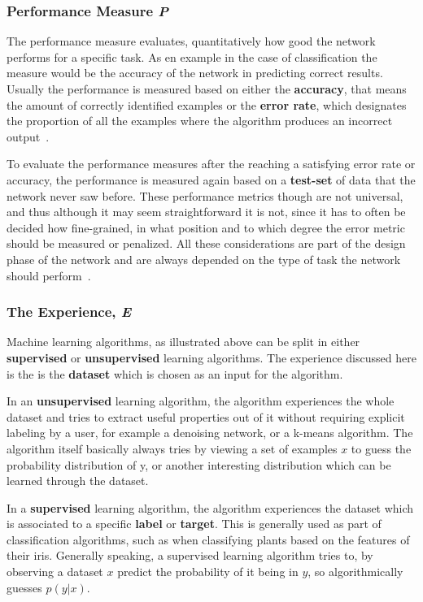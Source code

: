 \documentclass[12pt]{article}
\begin{document}
\subsubsection{Performance Measure \textit{P}}
\label{subsub:performance_measure}

The performance measure evaluates, quantitatively how good the network performs for a specific task. As en example in the case of classification the measure would be the accuracy of the network in predicting correct results. Usually the performance is measured based on either the \textbf{accuracy}, that means the amount of correctly identified examples or the \textbf{error rate}, which designates the proportion of all the examples where the algorithm produces an incorrect output~\cite{deeplearningbook}.

To evaluate the performance measures after the reaching a satisfying error rate or accuracy, the performance is measured again based on a \textbf{test-set} of data that the network never saw before. These performance metrics though are not universal, and thus although it may seem straightforward it is not, since it has to often be decided how fine-grained, in what position and to which degree the error metric should be measured or penalized. All these considerations are part of the design phase of the network and are always depended on the type of task the network should perform~\cite{deeplearningbook}.

\subsubsection{The Experience, \textit{E}}
\label{subsub:the_experience}

Machine learning algorithms, as illustrated above can be split in either \textbf{supervised} or \textbf{unsupervised} learning algorithms. The experience discussed here is the is the \textbf{dataset} which is chosen as an input for the algorithm. 

In an \textbf{unsupervised} learning algorithm, the algorithm experiences the whole dataset and tries to extract useful properties out of it without requiring explicit labeling by a user, for example a denoising network, or a k-means algorithm. The algorithm itself basically always tries by viewing a set of examples $x$ to guess the probability distribution of y, or another interesting distribution which can be learned through the dataset. 

In a \textbf{supervised} learning algorithm, the algorithm experiences the dataset which is associated to a specific \textbf{label} or \textbf{target}. This is generally used as part of classification algorithms, such as when classifying plants based on the features of their iris. Generally speaking, a supervised learning algorithm tries to, by observing a dataset $x$ predict the probability of it being in $y$, so algorithmically guesses $p(y|x)$. 
\end{document}
